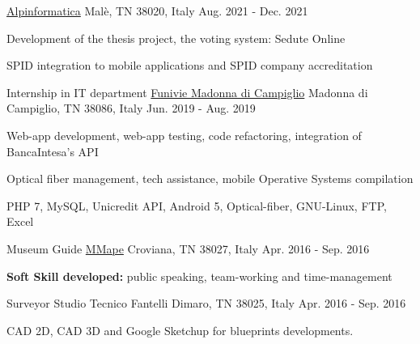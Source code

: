 \begin{cventries}
    {\href{https://www.alpinformatica.com/}{Alpinformatica}} %
    {Malè, TN 38020, Italy} %
    {Aug. 2021 - Dec. 2021} %
    {
      \begin{cvitems} %
        \item {Development of the thesis project, the voting system: Sedute Online}
        \item {SPID integration to mobile applications and SPID company accreditation}
      \end{cvitems}
      }
  \cventry
    {Internship in IT department} %
    {\href{https://www.funiviecampiglio.it}{Funivie Madonna di Campiglio}} %
    {Madonna di Campiglio, TN 38086, Italy} %
    {Jun. 2019 - Aug. 2019} %
    {
      \begin{cvitems} %
        \item {Web-app development, web-app testing, code refactoring, integration of BancaIntesa's API}
        \item {Optical fiber management, tech assistance, mobile Operative Systems compilation}
        \item {PHP 7, MySQL, Unicredit API, Android 5, Optical-fiber, GNU-Linux, FTP, Excel}
      \end{cvitems}
      }
    

  \cventry
    {Museum Guide} %
    {\href{https://www.mmape.it}{MMape}} %
    {Croviana, TN 38027, Italy} %
    {Apr. 2016 - Sep. 2016} %
    {
      \begin{cvitems} %
        \item {\textbf{Soft Skill developed:} public speaking, team-working and time-management}
      \end{cvitems}
    }

  \cventry
    {Surveyor} %
    {Studio Tecnico Fantelli} %
    {Dimaro, TN 38025, Italy} %
    {Apr. 2016 - Sep. 2016} %
    {
      \begin{cvitems} %
        \item {CAD 2D, CAD 3D and Google Sketchup for blueprints developments.}
      \end{cvitems}
    }


\end{cventries}
